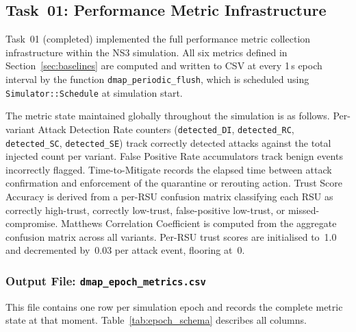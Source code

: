 \subsection{Task~01: Performance Metric Infrastructure}

Task~01 (completed) implemented the full performance
metric collection infrastructure within the NS3
simulation. All six metrics defined in
Section~\ref{sec:baselines} are computed and written
to CSV at every 1\,s epoch interval by the function
\texttt{dmap\_periodic\_flush}, which is scheduled
using \texttt{Simulator::Schedule} at simulation
start.

The metric state maintained globally throughout the
simulation is as follows. Per-variant Attack Detection
Rate counters (\texttt{detected\_DI},
\texttt{detected\_RC}, \texttt{detected\_SC},
\texttt{detected\_SE}) track correctly detected
attacks against the total injected count per variant.
False Positive Rate accumulators track benign events
incorrectly flagged. Time-to-Mitigate records the
elapsed time between attack confirmation and
enforcement of the quarantine or rerouting action.
Trust Score Accuracy is derived from a per-RSU
confusion matrix classifying each RSU as correctly
high-trust, correctly low-trust, false-positive
low-trust, or missed-compromise. Matthews Correlation
Coefficient is computed from the aggregate confusion
matrix across all variants. Per-RSU trust scores are
initialised to~1.0 and decremented by~0.03 per
attack event, flooring at~0.

\subsubsection{Output File: \texttt{dmap\_epoch\_metrics.csv}}

This file contains one row per simulation epoch and
records the complete metric state at that moment.
Table~\ref{tab:epoch_schema} describes all columns.

